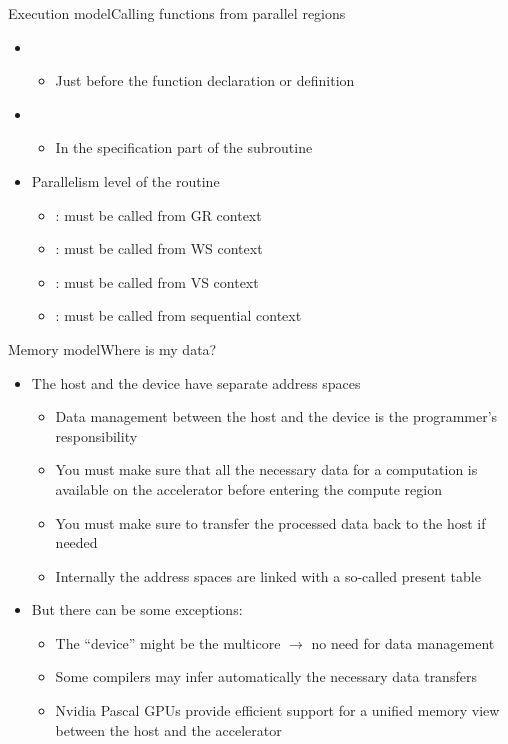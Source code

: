 \documentclass[12pt,aspectratio=169]{beamer}
\begin{document}
\begin{frame}[fragile]{Execution model}{Calling functions from parallel regions}
  \begin{itemize}
  \item {}
    \begin{itemize}
    \item Just before the function declaration or definition
    \end{itemize}
  \item {}
    \begin{itemize}
    \item In the specification part of the subroutine
    \end{itemize}
  \item Parallelism level of the routine
    \begin{itemize}
    \item {}: must be called from GR context
    \item {}: must be called from WS context
    \item {}: must be called from VS context
    \item {}: must be called from sequential context
    \end{itemize}
  \end{itemize}
\end{frame}

\begin{frame}[fragile]{Memory model}{Where is my data?}
  \begin{itemize}
  \item The host and the device have separate address spaces
    \begin{itemize}
    \item Data management between the host and the device is the programmer's responsibility
    \item You must make sure that all the necessary data for a computation is available on the accelerator before entering the compute region
    \item You must make sure to transfer the processed data back to the host if needed
    \item Internally the address spaces are linked with a so-called present table
    \end{itemize}
    \pause
    \vspace\baselineskip
  \item But there can be some exceptions:
    \begin{itemize}
    \item The ``device'' might be the multicore $\rightarrow$ no need for data management
    \item Some compilers may infer automatically the necessary data transfers
    \item Nvidia Pascal GPUs provide efficient support for a unified memory view between the host and the accelerator
    \end{itemize}
  \end{itemize}
\end{frame}
\end{document}
